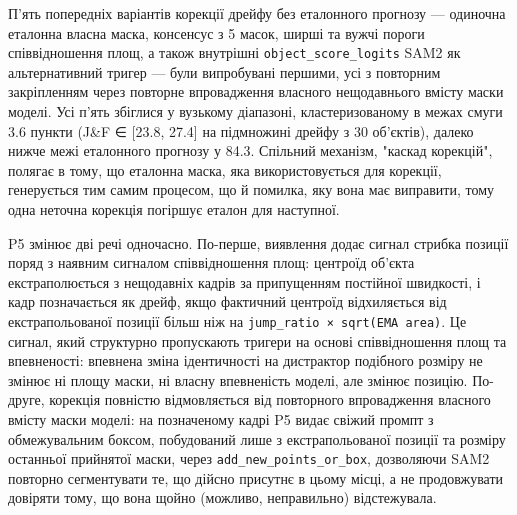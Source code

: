 \documentclass[11pt]{article}
\begin{document}
П'ять попередніх варіантів корекції дрейфу без еталонного прогнозу --- одиночна еталонна власна маска, консенсус з 5 масок, ширші та вужчі пороги співвідношення площ, а також внутрішні \texttt{object\_score\_logits} SAM2 як альтернативний тригер --- були випробувані першими, усі з повторним закріпленням через повторне впровадження власного нещодавнього вмісту маски моделі. Усі п'ять збіглися у вузькому діапазоні, кластеризованому в межах смуги 3.6 пункти (J\&F ∈ [23.8, 27.4] на підмножині дрейфу з 30 об'єктів), далеко нижче межі еталонного прогнозу у 84.3. Спільний механізм, "каскад корекцій", полягає в тому, що еталонна маска, яка використовується для корекції, генерується тим самим процесом, що й помилка, яку вона має виправити, тому одна неточна корекція погіршує еталон для наступної.

P5 змінює дві речі одночасно. По-перше, виявлення додає сигнал стрибка позиції поряд з наявним сигналом співвідношення площ: центроїд об'єкта екстраполюється з нещодавніх кадрів за припущенням постійної швидкості, і кадр позначається як дрейф, якщо фактичний центроїд відхиляється від екстрапольованої позиції більш ніж на \texttt{jump\_ratio × sqrt(EMA area)}. Це сигнал, який структурно пропускають тригери на основі співвідношення площ та впевненості: впевнена зміна ідентичності на дистрактор подібного розміру не змінює ні площу маски, ні власну впевненість моделі, але змінює позицію. По-друге, корекція повністю відмовляється від повторного впровадження власного вмісту маски моделі: на позначеному кадрі P5 видає свіжий промпт з обмежувальним боксом, побудований лише з екстрапольованої позиції та розміру останньої прийнятої маски, через \texttt{add\_new\_points\_or\_box}, дозволяючи SAM2 повторно сегментувати те, що дійсно присутнє в цьому місці, а не продовжувати довіряти тому, що вона щойно (можливо, неправильно) відстежувала.
\end{document}
